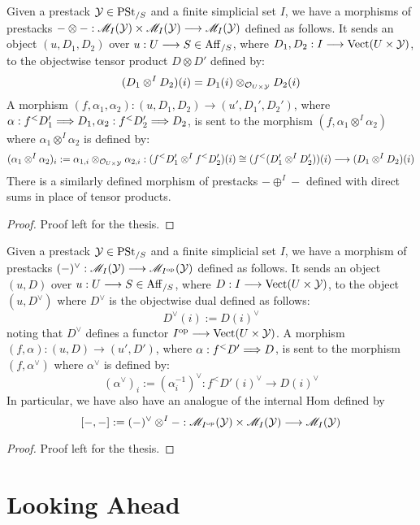 \documentclass[11pt]{amsart}
\begin{document}
\begin{thm}
Given a prestack $\mathcal{Y} \in \mathrm{PSt}_{/S}$ and a finite simplicial set $I$,
we have a morphisms of prestacks
$- \otimes - : \sM_I(\mcY) \times \sM_I(\mcY) \to \sM_I(\mcY)$
defined as follows.
It sends an object $(u, D_1, D_2)$ over $u : U \to S \in \Aff_{/S}$,
where $D_1, D_2 : I \to \Vect(U \times \mcY)$,
to the objectwise tensor product $D \otimes D'$ defined by:
\[
(D_1 \otimes^I D_2)(i) = D_1(i) \otimes_{\mathcal{O}_{U \times \mathcal{Y}}} D_2(i)
\]
A morphism $(f, \alpha_1, \alpha_2) : (u, D_1, D_2) \to (u', D_1', D_2')$,
where $\alpha : f^<D_1' \To D_1, \alpha_2 : f^<D_2' \To D_2$,
is sent to the morphism $(f, \alpha_1 \otimes^I \alpha_2)$ where
$\alpha_1 \otimes^I \alpha_2$ is defined by:
\[
(\alpha_1 \otimes^I \alpha_2)_i :=
\alpha_{1, i} \otimes_{\mcO_{U \times \mcY}} \alpha_{2, i} :
(f^<D_1' \otimes^I f^<D_2')(i) \cong (f^<(D_1' \otimes^I D_2'))(i) \to
(D_1 \otimes^I D_2)(i)
\]
There is a similarly defined morphism of prestacks
$- \oplus^I -$ defined with direct sums in place of tensor products.
\end{thm}
\begin{proof}
Proof left for the thesis.
\end{proof}

\begin{thm}
Given a prestack $\mathcal{Y} \in \mathrm{PSt}_{/S}$ and a finite simplicial set $I$,
we have a morphism of prestacks
$(-)^\vee : \sM_I(\mcY) \to \sM_{I^\op}(\mcY)$
defined as follows.
It sends an object $(u, D)$ over $u : U \to S \in \Aff_{/S}$,
where $D : I \to \Vect(U \times \mcY)$,
to the object $(u, D^\vee)$ where $D^\vee$ is the objectwise dual
defined as follows:
\[
D^\vee(i) := D(i)^\vee
\]
noting that $D^\vee$ defines a functor $I^\op \to \Vect(U \times \mcY)$.
A morphism
$(f, \alpha) : (u, D) \to (u', D')$,
where $\alpha : f^<D' \To D$, is sent
to the morphism $(f, \alpha^\vee)$ where $\alpha^\vee$ is defined by:
\[
(\alpha^\vee)_i := (\alpha_i^{-1})^\vee : f^<D'(i)^\vee \to D(i)^\vee
\]
In particular, we have also have an analogue of the internal Hom defined
by
\[
[-, -] := (-)^\vee \otimes^I - :
  \sM_{I^\op}(\mcY) \times \sM_I(\mcY) \to \sM_I(\mcY)
\]
\end{thm}
\begin{proof}
Proof left for the thesis.
\end{proof}


\section{Looking Ahead}\label{sec:Future}
\end{document}
